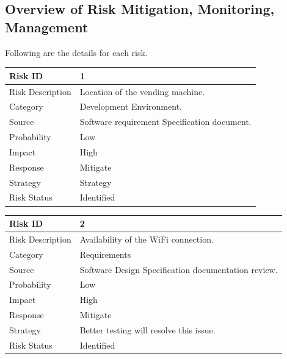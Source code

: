 \documentclass[oneside,a4paper,12pt]{report}
\begin{document}
\subsection{Overview of Risk Mitigation, Monitoring, Management}


Following are the details for each risk.
\begin{table}[!htbp]
\begin{center}
\def\arraystretch{1.5}
\begin{tabularx}{\textwidth}{| l | X |}
\hline 
Risk ID	& 1 \\ \hline
Risk Description	& Location of the vending machine.\\ \hline
Category	& Development Environment. \\ \hline
Source	& Software requirement Specification document. \\ \hline
Probability	& Low \\ \hline
Impact	& High \\ \hline
Response	& Mitigate \\ \hline
Strategy	& Strategy \\ \hline
Risk Status	& Identified \\ \hline
\end{tabularx}
\end{center}
\label{tab:risk1}
\end{table}

\begin{table}[!htbp]
\begin{center}
\def\arraystretch{1.5}
\begin{tabularx}{\textwidth}{| l | X |}
\hline 
Risk ID	& 2 \\ \hline
Risk Description	& Availability of the WiFi connection.\\ \hline
Category	& Requirements \\ \hline
Source	& Software Design Specification documentation review. \\ \hline
Probability	& Low \\ \hline
Impact	& High \\ \hline
Response	& Mitigate \\ \hline
Strategy	& Better testing will resolve this issue.  \\ \hline
Risk Status	& Identified \\ \hline
\end{tabularx}
\end{center}
\label{tab:risk2}
\end{table}
\end{document}
